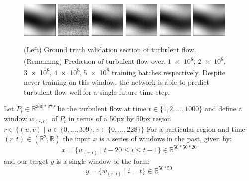 \begin{figure}
	\begin{center}
		\includegraphics[width=0.15\textwidth]{images/prediction/labe.png}
		\includegraphics[width=0.15\textwidth]{images/prediction/5.png}
		\includegraphics[width=0.15\textwidth]{images/prediction/10.png}
		\includegraphics[width=0.15\textwidth]{images/prediction/15.png}
		\includegraphics[width=0.15\textwidth]{images/prediction/20.png}
		\includegraphics[width=0.15\textwidth]{images/prediction/25.png}
		\caption{\small (Left) Ground truth validation section of turbulent flow. (Remaining) Prediction of turbulent flow over, \num{1e+8}, \num{2e+8}, \num{3e+8}, \num{4e+8}, \num{5e+8} training batches respectively. Despite never training on this window, the network is able to predict turbulent flow well for a single future time-step.}
		\label{training}
	\end{center}	
\end{figure}



Let $P_t \in \mathbb{R}^{360*279} $ be the turbulent flow at time $t \in \{1, 2, ..., 1000\}$ and define a window $w_{(r, t)}$ of $P_t$ in terms of a 50px by 50px region $r \in \{(u,v) \mid u \in \{0, ..., 309\}, v \in \{0, ...,  228\}\}$ 
For a particular region and time $(r,t) \in (\mathbb{R}^2,\mathbb{R})$ the input $x$ is a series of windows in the past, given by:
 $$x = \{w_{(r,i)} \mid t-20 \leq i \leq t-1 \} \in \mathbb{R}^{50*50*20}$$ and our target $y$ is a single window of the form: $$y = \{w_{(r,i)} \mid i = t  \} \in \mathbb{R}^{50*50}$$

